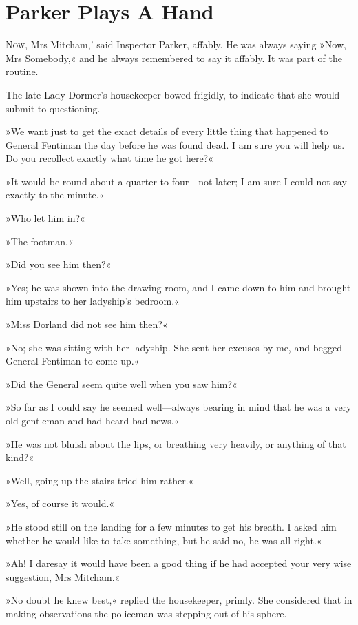 \chapter{Parker Plays A Hand}

\lettrine[lines=4,ante=‘]{N}{ow}, Mrs Mitcham,' said Inspector Parker, affably. He was always saying »Now, Mrs Somebody,« and he always remembered to say it affably. It was part of the routine.

\zz
The late Lady Dormer's housekeeper bowed frigidly, to indicate that she would submit to questioning.

»We want just to get the exact details of every little thing that happened to General Fentiman the day before he was found dead. I am sure you will help us. Do you recollect exactly what time he got here?«

»It would be round about a quarter to four\allowbreak---\allowbreak not later; I am sure I could not say exactly to the minute.«

»Who let him in?«

»The footman.«

»Did you see him then?«

»Yes; he was shown into the drawing-room, and I came down to him and brought him upstairs to her ladyship's bedroom.«

»Miss Dorland did not see him then?«

»No; she was sitting with her ladyship. She sent her excuses by me, and begged General Fentiman to come up.«

»Did the General seem quite well when you saw him?«

»So far as I could say he seemed well\allowbreak---\allowbreak always bearing in mind that he was a very old gentleman and had heard bad news.«

»He was not bluish about the lips, or breathing very heavily, or anything of that kind?«

»Well, going up the stairs tried him rather.«

»Yes, of course it would.«

»He stood still on the landing for a few minutes to get his breath. I asked him whether he would like to take something, but he said no, he was all right.«

»Ah! I daresay it would have been a good thing if he had accepted your very wise suggestion, Mrs Mitcham.«

»No doubt he knew best,« replied the housekeeper, primly. She considered that in making observations the policeman was stepping out of his sphere.

